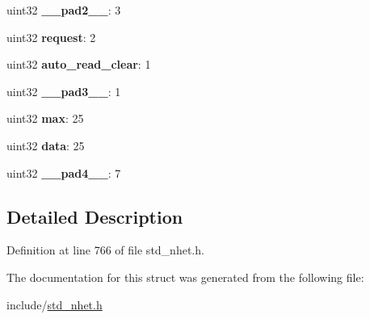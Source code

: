 \begin{DoxyCompactItemize}
\item 
\mbox{\label{structCNT__format_a3edf674d7dcc8f29d299189d45399222}} 
uint32 {\bfseries \+\_\+\+\_\+pad2\+\_\+\+\_\+}\+: 3
\item 
\mbox{\label{structCNT__format_ab8625613f9849c615f5d2a09da735e37}} 
uint32 {\bfseries request}\+: 2
\item 
\mbox{\label{structCNT__format_af86d74c0bc5c157f5b1fdbb9ec881e16}} 
uint32 {\bfseries auto\+\_\+read\+\_\+clear}\+: 1
\item 
\mbox{\label{structCNT__format_a4d092b7cb1812dd98c3e81c3f19715b4}} 
uint32 {\bfseries \+\_\+\+\_\+pad3\+\_\+\+\_\+}\+: 1
\item 
\mbox{\label{structCNT__format_a9b1f26266c22423ed9861c02424c2ac4}} 
uint32 {\bfseries max}\+: 25
\item 
\mbox{\label{structCNT__format_ad70d709ed338c19e060ce8556b127153}} 
uint32 {\bfseries data}\+: 25
\item 
\mbox{\label{structCNT__format_ad60530556b3ad6582e3803d24f540168}} 
uint32 {\bfseries \+\_\+\+\_\+pad4\+\_\+\+\_\+}\+: 7
\end{DoxyCompactItemize}


\subsection{Detailed Description}


Definition at line 766 of file std\+\_\+nhet.\+h.



The documentation for this struct was generated from the following file\+:\begin{DoxyCompactItemize}
\item 
include/\mbox{\hyperlink{std__nhet_8h}{std\+\_\+nhet.\+h}}\end{DoxyCompactItemize}
